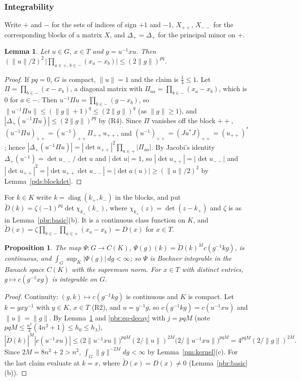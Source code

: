 \documentclass[10pt]{amsart}
\newtheorem{proposition}[theorem]{Proposition}
\newtheorem{lemma}[theorem]{Lemma}
\theoremstyle{definition}
\theoremstyle{remark}
\begin{document}
\subsubsection{Integrability}\label{pbr:ss-int}

Write $+$ and $-$ for the sets of indices of sign $+1$ and $-1$, $X_{++}$, $X_{--}$ for the
corresponding blocks of a matrix $X$, and $\Delta_+=\Delta_{+}$ for the principal minor on $+$.

\begin{lemma}\label{pbr:minor}
Let $u\in G$, $x\in T$ and $g=u^{-1}xu$. Then
$(\|u\|/2)^2\,\bigl|\prod_{a\in+,\,b\in-}(x_a-x_b)\bigr|\le(2\|g\|)^{pq}$.
\end{lemma}
\begin{proof}
If $pq=0$, $G$ is compact, $\|u\|=1$ and the claim is $\frac14\le1$. Let $\Pi=\prod_{b\in-}(x-x_b)$,
a diagonal matrix with $\Pi_{aa}=\prod_{b\in-}(x_a-x_b)$, which is $0$ for $a\in-$. Then
$u^{-1}\Pi u=\prod_{b\in-}(g-x_b)$, so $\|u^{-1}\Pi u\|\le(\|g\|+1)^q\le(2\|g\|)^q$ (as $\|g\|\ge1$),
and $|\Delta_+(u^{-1}\Pi u)|\le(2\|g\|)^{pq}$ by (R4). Since $\Pi$ vanishes off the block $++$,
$(u^{-1}\Pi u)_{++}=(u^{-1})_{++}\Pi_{++}u_{++}$, and $(u^{-1})_{++}=(Ju^*J)_{++}=(u_{++})^*$; hence
$|\Delta_+(u^{-1}\Pi u)|=|\det u_{++}|^2\prod_{a\in+}|\Pi_{aa}|$. By Jacobi's identity
$\Delta_+(u^{-1})=\det u_{--}/\det u$ and $|\det u|=1$, so $|\det u_{++}|=|\det u_{--}|$ and
$|\det u_{++}|^2=|\det u_{++}\det u_{--}|=|\det a(u)|\ge(\|u\|/2)^2$ by Lemma~\ref{pds:blockdet}.
\end{proof}

For $k\in K$ write $k=\operatorname{diag}(k_+,k_-)$ in the blocks, and put $\widetilde D(k)=
\zeta(-1)^{pq}\det\chi_{k_+}(k_-)$, where $\chi_{k_+}(z)=\det(z-k_+)$ and $\zeta$ is as in
Lemma~\ref{pbr:basic}(b). It is a continuous class function on $K$, and $\widetilde D(x)=
\zeta\prod_{b\in-}\prod_{a\in+}(x_a-x_b)=D(x)$ for $x\in T$.

\begin{proposition}\label{pbr:int}
The map $\Psi\colon G\to C(K)$, $\Psi(g)(k)=\widetilde D(k)^Mc(g^{-1}kg)$, is continuous, and
$\int_G\sup_K|\Psi(g)|\,dg<\infty$; so $\Psi$ is Bochner integrable in the Banach space $C(K)$ with the
supremum norm. For $x\in T$ with distinct entries, $g\mapsto c(g^{-1}xg)$ is integrable on $G$.
\end{proposition}
\begin{proof}
Continuity: $(g,k)\mapsto c(g^{-1}kg)$ is continuous and $K$ is compact. Let $k=yxy^{-1}$ with
$y\in K$, $x\in T$ (R2), and $u=y^{-1}g$, so $c(g^{-1}kg)=c(u^{-1}xu)$ and $\|u\|=\|g\|$. By
Lemma~\ref{pbr:minor} and \eqref{pbr:eq-decay} with $j=pqM$ (note $pqM\le\frac{n^2}4(4n^2+1)\le
h_0\le h_\lambda$),
\[
|\widetilde D(k)|^M|c(u^{-1}xu)|\le\bigl(2\|u^{-1}xu\|\bigr)^{pqM}(2/\|u\|)^{2M}\bigl(2/\|u^{-1}xu\|
\bigr)^{pqM}=4^{pqM}(2/\|g\|)^{2M}.
\]
Since $2M=8n^2+2>n^2$, $\int_G\|g\|^{-2M}dg<\infty$ by Lemma~\ref{pm:kernel}(c). For the last claim
evaluate at $k=x$, where $\widetilde D(x)=D(x)\ne0$ (Lemma~\ref{pbr:basic}(b)).
\end{proof}
\end{document}
